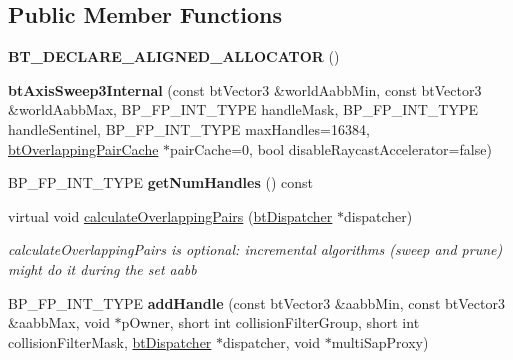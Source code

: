 \subsection*{Public Member Functions}
\begin{DoxyCompactItemize}
\item 
\hypertarget{classbt_axis_sweep3_internal_ad90bd2c40561f5151dee7a938a0afe44}{{\bfseries B\+T\+\_\+\+D\+E\+C\+L\+A\+R\+E\+\_\+\+A\+L\+I\+G\+N\+E\+D\+\_\+\+A\+L\+L\+O\+C\+A\+T\+O\+R} ()}\label{classbt_axis_sweep3_internal_ad90bd2c40561f5151dee7a938a0afe44}

\item 
\hypertarget{classbt_axis_sweep3_internal_ac995b48f3a60ffac694c1d3c1e891226}{{\bfseries bt\+Axis\+Sweep3\+Internal} (const bt\+Vector3 \&world\+Aabb\+Min, const bt\+Vector3 \&world\+Aabb\+Max, B\+P\+\_\+\+F\+P\+\_\+\+I\+N\+T\+\_\+\+T\+Y\+P\+E handle\+Mask, B\+P\+\_\+\+F\+P\+\_\+\+I\+N\+T\+\_\+\+T\+Y\+P\+E handle\+Sentinel, B\+P\+\_\+\+F\+P\+\_\+\+I\+N\+T\+\_\+\+T\+Y\+P\+E max\+Handles=16384, \hyperlink{classbt_overlapping_pair_cache}{bt\+Overlapping\+Pair\+Cache} $\ast$pair\+Cache=0, bool disable\+Raycast\+Accelerator=false)}\label{classbt_axis_sweep3_internal_ac995b48f3a60ffac694c1d3c1e891226}

\item 
\hypertarget{classbt_axis_sweep3_internal_a125212ba6c8672df4afc2e5327665966}{B\+P\+\_\+\+F\+P\+\_\+\+I\+N\+T\+\_\+\+T\+Y\+P\+E {\bfseries get\+Num\+Handles} () const }\label{classbt_axis_sweep3_internal_a125212ba6c8672df4afc2e5327665966}

\item 
virtual void \hyperlink{classbt_axis_sweep3_internal_ab89835d4ecb51e2dadc7e3b6e7c29adb}{calculate\+Overlapping\+Pairs} (\hyperlink{classbt_dispatcher}{bt\+Dispatcher} $\ast$dispatcher)
\begin{DoxyCompactList}\small\item\em calculate\+Overlapping\+Pairs is optional\+: incremental algorithms (sweep and prune) might do it during the set aabb \end{DoxyCompactList}\item 
\hypertarget{classbt_axis_sweep3_internal_ad83a70943bd46e24813b16fbc02b38d6}{B\+P\+\_\+\+F\+P\+\_\+\+I\+N\+T\+\_\+\+T\+Y\+P\+E {\bfseries add\+Handle} (const bt\+Vector3 \&aabb\+Min, const bt\+Vector3 \&aabb\+Max, void $\ast$p\+Owner, short int collision\+Filter\+Group, short int collision\+Filter\+Mask, \hyperlink{classbt_dispatcher}{bt\+Dispatcher} $\ast$dispatcher, void $\ast$multi\+Sap\+Proxy)}\label{classbt_axis_sweep3_internal_ad83a70943bd46e24813b16fbc02b38d6}


\end{DoxyCompactItemize}
